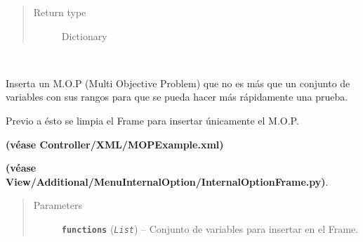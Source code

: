 \documentclass[letterpaper,10pt,english]{sphinxmanual}
\begin{document}
\begin{fulllineitems}
\begin{fulllineitems}
\begin{quote}
\begin{description}
\item[{Return type}] \leavevmode
Dictionary

\end{description}\end{quote}

\end{fulllineitems}


\begin{fulllineitems}
\label{View/Main/DecisionVariable/VariableFrame:View.Main.DecisionVariable.VariableFrame.VariableFrame.insert_mop_example}~
\begin{DUlineblock}{0em}
\item[] Inserta un M.O.P (Multi Objective Problem) que no es más que un conjunto de 
variables con sus rangos para que se pueda hacer más rápidamente una prueba.
\item[] Previo a ésto se limpia el Frame para insertar únicamente el M.O.P.
\item[] \textbf{(véase Controller/XML/MOPExample.xml)}
\item[] \textbf{(véase View/Additional/MenuInternalOption/InternalOptionFrame.py)}.
\end{DUlineblock}
\begin{quote}\begin{description}
\item[{Parameters}] \leavevmode
\textbf{\texttt{functions}} (\emph{\texttt{List}}) -- Conjunto de variables para insertar en el Frame.

\end{description}\end{quote}

\end{fulllineitems}



\end{fulllineitems}
\end{document}
